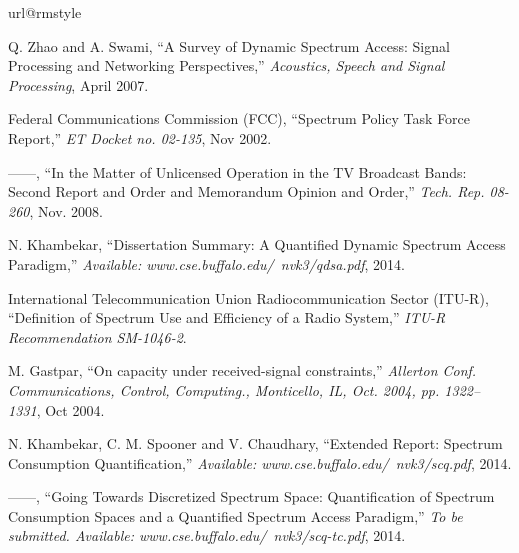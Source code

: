 \documentclass[12pt, draftclsnofoot, onecolumn]{IEEEtran}
\begin{document}
\begin{thebibliography}{10}
\providecommand{\url}[1]{#1}
\csname url@rmstyle\endcsname
\providecommand{\newblock}{\relax}
\providecommand{\bibinfo}[2]{#2}
\providecommand\BIBentrySTDinterwordspacing{\spaceskip=0pt\relax}
\providecommand\BIBentryALTinterwordstretchfactor{4}
\providecommand\BIBentryALTinterwordspacing{\spaceskip=\fontdimen2\font plus
\BIBentryALTinterwordstretchfactor\fontdimen3\font minus
  \fontdimen4\font\relax}
\providecommand\BIBforeignlanguage[2]{{\expandafter\ifx\csname l@#1\endcsname\relax
\typeout{** WARNING: IEEEtran.bst: No hyphenation pattern has been}\typeout{** loaded for the language `#1'. Using the pattern for}\typeout{** the default language instead.}\else
\language=\csname l@#1\endcsname
\fi
#2}}

{{Q. Zhao and A. Swami}}, ``{A Survey of Dynamic Spectrum Access: Signal
  Processing and Networking Perspectives},'' \emph{Acoustics, Speech and Signal
  Processing}, April 2007.

{Federal Communications Commission (FCC)}, ``{Spectrum Policy Task Force
  Report},'' \emph{ET Docket no. 02-135}, Nov 2002.

------, ``{In the Matter of Unlicensed Operation in the TV Broadcast Bands:
  Second Report and Order and Memorandum Opinion and Order},'' \emph{Tech. Rep.
  08-260}, Nov. 2008.

{N. Khambekar}, ``{Dissertation Summary: A Quantified Dynamic Spectrum Access
  Paradigm},'' \emph{{Available: www.cse.buffalo.edu/~nvk3/qdsa.pdf}}, 2014.

{International Telecommunication Union Radiocommunication Sector (ITU-R)},
  ``{Definition of Spectrum Use and Efficiency of a Radio System},''
  \emph{ITU-R Recommendation SM-1046-2}.

{M. Gastpar}, ``{On capacity under received-signal constraints},''
  \emph{Allerton Conf. Communications, Control, Computing., Monticello, IL,
  Oct. 2004, pp. 1322–1331}, Oct 2004.

{N. Khambekar, C. M. Spooner and V. Chaudhary}, ``{Extended Report: Spectrum
  Consumption Quantification},'' \emph{{Available:
  www.cse.buffalo.edu/~nvk3/scq.pdf}}, 2014.

------, ``{Going Towards Discretized Spectrum Space: Quantification of Spectrum
  Consumption Spaces and a Quantified Spectrum Access Paradigm},'' \emph{To be
  submitted. {Available: www.cse.buffalo.edu/~nvk3/scq-tc.pdf}}, 2014.


\end{thebibliography}
\end{document}
